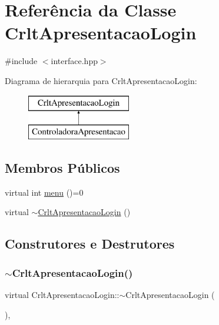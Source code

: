 \hypertarget{class_crlt_apresentacao_login}{}\section{Referência da Classe Crlt\+Apresentacao\+Login}
\label{class_crlt_apresentacao_login}


{\ttfamily \#include $<$interface.\+hpp$>$}

Diagrama de hierarquia para Crlt\+Apresentacao\+Login\+:\begin{figure}[H]
\begin{center}
\leavevmode
\includegraphics[height=2.000000cm]{class_crlt_apresentacao_login}
\end{center}
\end{figure}
\subsection*{Membros Públicos}
\begin{DoxyCompactItemize}
\item 
virtual int \mbox{\hyperlink{class_crlt_apresentacao_login_a76226b00329c638d6de95458ad87756e}{menu}} ()=0
\item 
virtual \mbox{\hyperlink{class_crlt_apresentacao_login_a8fba6ea4b607b28d377af308d617aa05}{$\sim$\+Crlt\+Apresentacao\+Login}} ()
\end{DoxyCompactItemize}


\subsection{Construtores e Destrutores}
\mbox{\label{class_crlt_apresentacao_login_a8fba6ea4b607b28d377af308d617aa05}} 
\subsubsection{\texorpdfstring{$\sim$\+Crlt\+Apresentacao\+Login()}{~CrltApresentacaoLogin()}}
{\footnotesize\ttfamily virtual Crlt\+Apresentacao\+Login\+::$\sim$\+Crlt\+Apresentacao\+Login (\begin{DoxyParamCaption}{ }\end{DoxyParamCaption})\hspace{0.3cm}{\ttfamily [inline]}, {\ttfamily [virtual]}}


